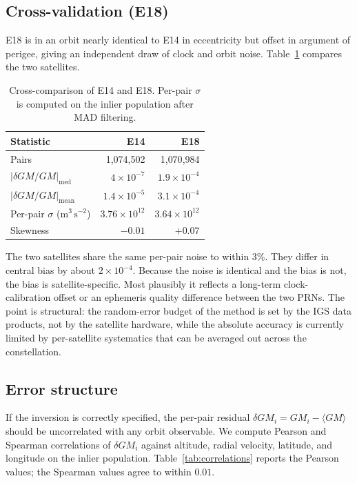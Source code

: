 \documentclass[11pt,a4paper]{article}
\begin{document}
\subsection{Cross-validation (E18)}

E18 is in an orbit nearly identical to E14 in eccentricity but offset in argument of perigee, giving an independent draw of clock and orbit noise. Table~\ref{tab:e14-vs-e18} compares the two satellites.

\begin{table}[h]
    \centering
    \caption{Cross-comparison of E14 and E18. Per-pair $\sigma$ is computed on the inlier population after MAD filtering.}
    \label{tab:e14-vs-e18}
    \begin{tabular}{lrr}
        \toprule
        Statistic & E14 & E18 \\
        \midrule
        Pairs & 1{,}074{,}502 & 1{,}070{,}984 \\
        $|\delta GM/GM|_\text{med}$ & $4 \times 10^{-7}$ & $1.9 \times 10^{-4}$ \\
        $|\delta GM/GM|_\text{mean}$ & $1.4 \times 10^{-5}$ & $3.1 \times 10^{-4}$ \\
        Per-pair $\sigma$ ($\mathrm{m^3\,s^{-2}}$) & $3.76 \times 10^{12}$ & $3.64 \times 10^{12}$ \\
        Skewness & $-0.01$ & $+0.07$ \\
        \bottomrule
    \end{tabular}
\end{table}

The two satellites share the same per-pair noise to within 3\%. They differ in central bias by about $2 \times 10^{-4}$. Because the noise is identical and the bias is not, the bias is satellite-specific. Most plausibly it reflects a long-term clock-calibration offset or an ephemeris quality difference between the two PRNs. The point is structural: the random-error budget of the method is set by the IGS data products, not by the satellite hardware, while the absolute accuracy is currently limited by per-satellite systematics that can be averaged out across the constellation.

\subsection{Error structure}
\label{sec:errors}

If the inversion is correctly specified, the per-pair residual $\delta GM_i = GM_i - \langle GM \rangle$ should be uncorrelated with any orbit observable. We compute Pearson and Spearman correlations of $\delta GM_i$ against altitude, radial velocity, latitude, and longitude on the inlier population. Table~\ref{tab:correlations} reports the Pearson values; the Spearman values agree to within $0.01$.
\end{document}
